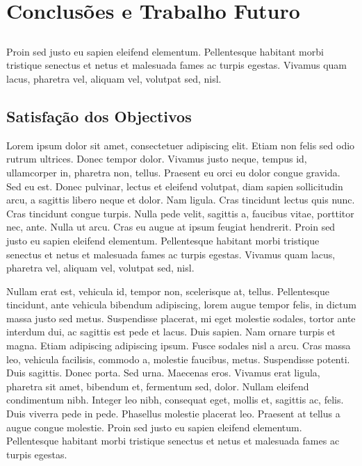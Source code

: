 \chapter{Conclusões e Trabalho Futuro} \label{chap:concl}

\section*{}

Proin sed justo eu sapien eleifend elementum. Pellentesque
habitant morbi tristique senectus et netus et malesuada fames ac
turpis egestas. Vivamus quam lacus, pharetra vel, aliquam vel,
volutpat sed, nisl. 

\section{Satisfação dos Objectivos}

Lorem ipsum dolor sit amet, consectetuer adipiscing elit. Etiam non
felis sed odio rutrum ultrices. Donec tempor dolor. Vivamus justo
neque, tempus id, ullamcorper in, pharetra non, tellus. Praesent eu
orci eu dolor congue gravida. Sed eu est. Donec pulvinar, lectus et
eleifend volutpat, diam sapien sollicitudin arcu, a sagittis libero
neque et dolor. Nam ligula. Cras tincidunt lectus quis nunc. Cras
tincidunt congue turpis. Nulla pede velit, sagittis a, faucibus vitae,
porttitor nec, ante. Nulla ut arcu. Cras eu augue at ipsum feugiat
hendrerit. Proin sed justo eu sapien eleifend elementum. Pellentesque
habitant morbi tristique senectus et netus et malesuada fames ac
turpis egestas. Vivamus quam lacus, pharetra vel, aliquam vel,
volutpat sed, nisl. 

Nullam erat est, vehicula id, tempor non, scelerisque at,
tellus. Pellentesque tincidunt, ante vehicula bibendum adipiscing,
lorem augue tempor felis, in dictum massa justo sed metus. Suspendisse
placerat, mi eget molestie sodales, tortor ante interdum dui, ac
sagittis est pede et lacus. Duis sapien. Nam ornare turpis et
magna. Etiam adipiscing adipiscing ipsum. Fusce sodales nisl a
arcu. Cras massa leo, vehicula facilisis, commodo a, molestie
faucibus, metus. Suspendisse potenti. Duis sagittis. Donec porta. Sed
urna. Maecenas eros. Vivamus erat ligula, pharetra sit amet, bibendum
et, fermentum sed, dolor. Nullam eleifend condimentum nibh. Integer
leo nibh, consequat eget, mollis et, sagittis ac, felis. Duis viverra
pede in pede. Phasellus molestie placerat leo. Praesent at tellus a
augue congue molestie. Proin sed justo eu sapien eleifend
elementum. Pellentesque habitant morbi tristique senectus et netus et
malesuada fames ac turpis egestas. 

